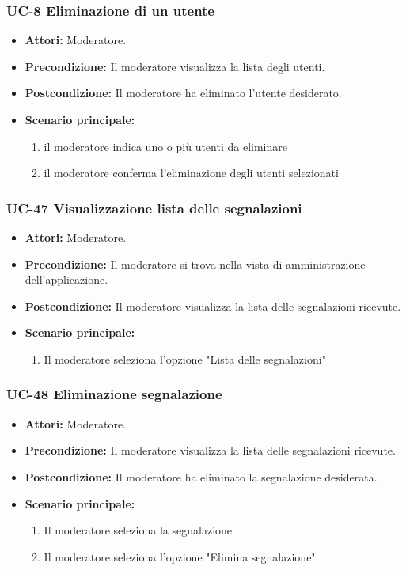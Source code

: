\subsubsection{UC-8 Eliminazione di un utente}
\begin{itemize}
	\item \textbf{Attori:} Moderatore.
	\item \textbf{Precondizione:} Il moderatore visualizza la lista degli utenti.
	\item \textbf{Postcondizione:} Il moderatore ha eliminato l'utente desiderato.
	\item \textbf{Scenario principale:}
	\begin{enumerate}
		\item il moderatore indica uno o più utenti da eliminare
		\item il moderatore conferma l'eliminazione degli utenti selezionati
	\end{enumerate}
\end{itemize}

\subsubsection{UC-47 Visualizzazione lista delle segnalazioni}
\begin{itemize}
	\item \textbf{Attori:} Moderatore.
	\item \textbf{Precondizione:} Il moderatore si trova nella vista di amministrazione dell'applicazione.
	\item \textbf{Postcondizione:} Il moderatore visualizza la lista delle segnalazioni ricevute.
	\item \textbf{Scenario principale:}
	\begin{enumerate}
		\item Il moderatore seleziona l'opzione "Lista delle segnalazioni"
	\end{enumerate}
\end{itemize}

\subsubsection{UC-48 Eliminazione segnalazione}
\begin{itemize}
	\item \textbf{Attori:} Moderatore.
	\item \textbf{Precondizione:} Il moderatore visualizza la lista delle segnalazioni ricevute.
	\item \textbf{Postcondizione:} Il moderatore ha eliminato la segnalazione desiderata.
	\item \textbf{Scenario principale:}
	\begin{enumerate}
		\item Il moderatore seleziona la segnalazione
		\item Il moderatore seleziona l'opzione "Elimina segnalazione"
	\end{enumerate}
\end{itemize}

